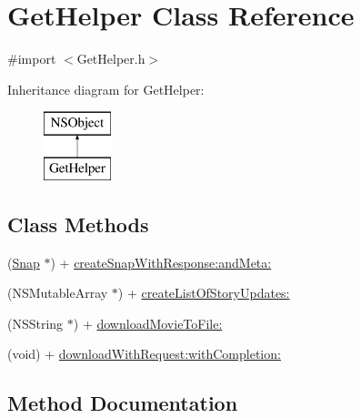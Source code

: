 \hypertarget{interface_get_helper}{}\section{Get\+Helper Class Reference}
\label{interface_get_helper}


{\ttfamily \#import $<$Get\+Helper.\+h$>$}

Inheritance diagram for Get\+Helper\+:\begin{figure}[H]
\begin{center}
\leavevmode
\includegraphics[height=2.000000cm]{interface_get_helper}
\end{center}
\end{figure}
\subsection*{Class Methods}
\begin{DoxyCompactItemize}
\item 
(\hyperlink{interface_snap}{Snap} $\ast$) + \hyperlink{interface_get_helper_aa40b94636ae53ee54db9a11c7480fd2b}{create\+Snap\+With\+Response\+:and\+Meta\+:}
\item 
(N\+S\+Mutable\+Array $\ast$) + \hyperlink{interface_get_helper_a65af4d1c573fa738e40df55957a4d4d1}{create\+List\+Of\+Story\+Updates\+:}
\item 
(N\+S\+String $\ast$) + \hyperlink{interface_get_helper_ad1e95f6ad276d176fb7fb59b0fc1c7a9}{download\+Movie\+To\+File\+:}
\item 
(void) + \hyperlink{interface_get_helper_a8b0554dfefdc23e2e9705484153b3f5e}{download\+With\+Request\+:with\+Completion\+:}
\end{DoxyCompactItemize}


\subsection{Method Documentation}
\hypertarget{interface_get_helper_a65af4d1c573fa738e40df55957a4d4d1}{}\label{interface_get_helper_a65af4d1c573fa738e40df55957a4d4d1} 
